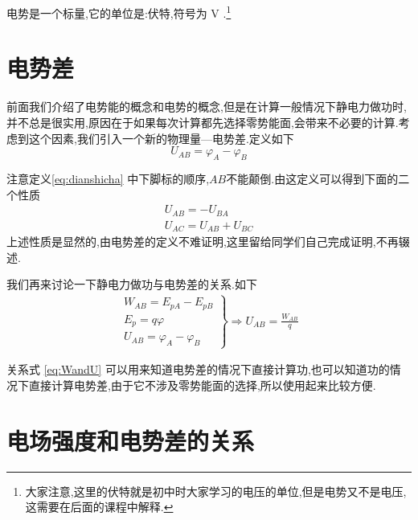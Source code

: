   电势是一个标量,它的单位是:伏特,符号为 V .\footnote{大家注意,这里的伏特就是初中时大家学习的电压的单位,但是电势又不是电压,这需要在后面的课程中解释.}

  \section{电势差}

  前面我们介绍了电势能的概念和电势的概念,但是在计算一般情况下静电力做功时,并不总是很实用,原因在于如果每次计算都先选择零势能面,会带来不必要的计算.考虑到这个因素,我们引入一个新的物理量---电势差.定义如下
  \begin{equation}
    U_{AB}=\varphi_A-\varphi_B
    \label{eq:dianshicha}
  \end{equation}

  注意定义\eqref{eq:dianshicha} 中下脚标的顺序,$AB$不能颠倒.由这定义可以得到下面的二个性质
  \begin{gather}
    U_{AB}=-U_{BA}\\
    U_{AC}=U_{AB}+U_{BC}
  \end{gather}
  上述性质是显然的,由电势差的定义不难证明,这里留给同学们自己完成证明,不再辍述.

  我们再来讨论一下静电力做功与电势差的关系.如下
  \begin{gather}
    \left.
    \begin{gathered}
    W_{AB}=E_{pA}-E_{pB}\\
    E_p=q\varphi\\
    U_{AB}=\varphi_A-\varphi_B
    \end{gathered}
  \right\}
  \Longrightarrow
  U_{AB}=\frac{W_{AB}}{q}
  \label{eq:WandU}
  \end{gather}

  关系式 \eqref{eq:WandU} 可以用来知道电势差的情况下直接计算功,也可以知道功的情况下直接计算电势差,由于它不涉及零势能面的选择,所以使用起来比较方便.

  \section{电场强度和电势差的关系}

